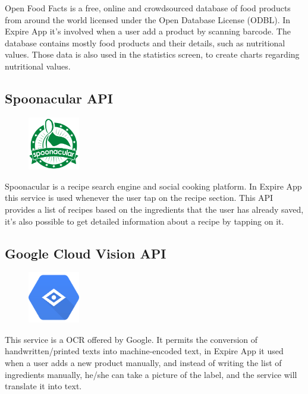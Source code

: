 Open Food Facts is a free, online and crowdsourced database of food products from around the world licensed under the Open Database License (ODBL).
In Expire App it's involved when a user add a product by scanning barcode.
The database contains mostly food products and their details, such as nutritional values.
Those data is also used in the statistics screen, to create charts regarding nutritional values.
\newpage

\subsection{Spoonacular API}
\begin{figure}
\vspace{-0.8cm}
\includegraphics[width=0.20\textwidth]{Images/external_serv/spoonacular.png}
\end{figure}
Spoonacular is a recipe search engine and social cooking platform. In Expire App  this service is used whenever the user tap on the recipe section.
This API provides a list of recipes based on the ingredients that the user has already saved, it's also possible to get detailed information about a recipe by tapping on it.\newline

\subsection{Google Cloud Vision API}
\begin{figure}
\vspace{-0.8cm}
\includegraphics[width=0.20\textwidth]{Images/external_serv/vision_api.png}
\end{figure}
This service is a OCR offered by Google.
It permits the conversion of handwritten/printed texts into machine-encoded text, in Expire App it used when a user adds a new product manually, and instead of writing the list of ingredients manually, he/she can take a picture of the label, and the service will translate it into text.

